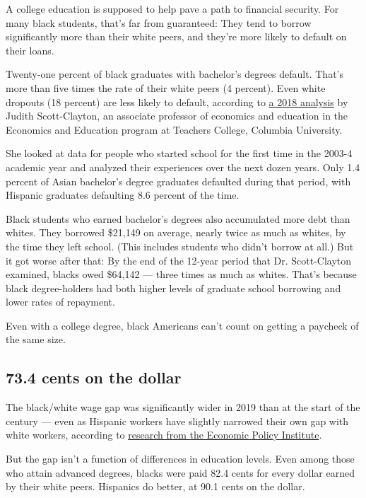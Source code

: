 A college education is supposed to help pave a path to financial
security. For many black students, that's far from guaranteed: They tend
to borrow significantly more than their white peers, and they're more
likely to default on their loans.

Twenty-one percent of black graduates with bachelor's degrees default.
That's more than five times the rate of their white peers (4 percent).
Even white dropouts (18 percent) are less likely to default, according
to
\href{https://www.brookings.edu/research/the-looming-student-loan-default-crisis-is-worse-than-we-thought/}{a
2018 analysis} by Judith Scott-Clayton, an associate professor of
economics and education in the Economics and Education program at
Teachers College, Columbia University.

She looked at data for people who started school for the first time in
the 2003-4 academic year and analyzed their experiences over the next
dozen years. Only 1.4 percent of Asian bachelor's degree graduates
defaulted during that period, with Hispanic graduates defaulting 8.6
percent of the time.

Black students who earned bachelor's degrees also accumulated more debt
than whites. They borrowed \$21,149 on average, nearly twice as much as
whites, by the time they left school. (This includes students who didn't
borrow at all.) But it got worse after that: By the end of the 12-year
period that Dr. Scott-Clayton examined, blacks owed \$64,142 --- three
times as much as whites. That's because black degree-holders had both
higher levels of graduate school borrowing and lower rates of repayment.

Even with a college degree, black Americans can't count on getting a
paycheck of the same size.

\hypertarget{734-cents-on-the-dollar}{%
\subsection{73.4 cents on the dollar}\label{734-cents-on-the-dollar}}

The black/white wage gap was significantly wider in 2019 than at the
start of the century --- even as Hispanic workers have slightly narrowed
their own gap with white workers, according to
\href{https://www.epi.org/publication/swa-wages-2019/}{research from the
Economic Policy Institute}.

But the gap isn't a function of differences in education levels. Even
among those who attain advanced degrees, blacks were paid 82.4 cents for
every dollar earned by their white peers. Hispanics do better, at 90.1
cents on the dollar.

